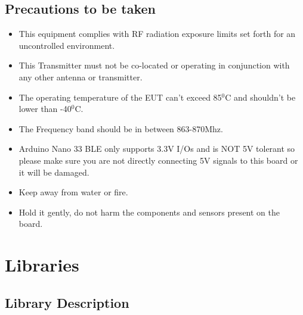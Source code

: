 \subsection{Precautions to be taken}


\begin{itemize}
	
	\item This equipment complies with RF radiation exposure limits set forth for an uncontrolled environment.
	\item This Transmitter must not be co-located or operating in conjunction with any other antenna or transmitter.
	\item The operating temperature of the EUT can't exceed 85$^{0}$C and shouldn't be lower than -40$^{0}$C.
	\item The Frequency band should be in between 863-870Mhz.
	\item Arduino Nano 33 BLE only supports 3.3V I/Os and is NOT 5V tolerant so please make sure you are not directly connecting 5V signals to this board or it will be damaged.
	\item Keep away from water or fire.
	\item Hold it gently, do not harm the components and sensors present on the board.
	
\end{itemize}




\section{Libraries}

\subsection{Library Description}


